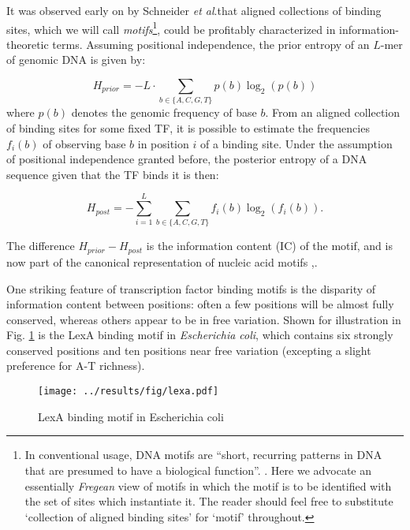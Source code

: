\documentclass{article}
\begin{document}
It was observed early on by Schneider \textit{et al}.\cite{schneider86}that
aligned collections of binding sites, which we will call
\textit{motifs}\footnote{In conventional usage, DNA motifs are ``short, recurring patterns in DNA that are presumed to have a biological function''.
  \cite{dhaeseleer06}.  Here we advocate an essentially
  \textit{Fregean} view of motifs in which the motif is to be
  identified with the set of sites which instantiate it.  The reader
  should feel free to substitute `collection of aligned binding sites'
  for `motif' throughout.}, could be profitably characterized in
information-theoretic terms.  Assuming positional independence, the
prior entropy of an $L$-mer of genomic DNA is given by:

\begin{equation}
  \label{eq:prior_entropy}
  H_{prior} = -L\cdot\sum_{b\in \{A,C,G,T\}}p(b)\log_2(p(b))
\end{equation}
where $p(b)$ denotes the genomic frequency of base $b$.  From an
aligned collection of binding sites for some fixed TF, it is possible
to estimate the frequencies $f_i(b)$ of observing base $b$
in position $i$ of a binding site.  Under the assumption of positional
independence granted before, the posterior entropy of a DNA sequence
given that the TF binds it is then:

\begin{equation}
  \label{eq:post_entropy}
  H_{post} = -\sum_{i=1}^L\sum_{b\in \{A,C,G,T\}}f_i(b)\log_2(f_i(b)).
\end{equation}

The difference $H_{prior}-H_{post}$ is the information content (IC) of
the motif, and is now part of the canonical representation of nucleic
acid motifs \cite{weblogo},\cite{schneider90}.

One striking feature of transcription factor binding motifs is the
disparity of information content between positions: often
a few positions will be almost fully conserved, whereas others appear
to be in free variation.  Shown for illustration in
Fig. \ref{fig:lexa_binding_motif} is the LexA binding motif in
\textit{Escherichia coli}, which contains six strongly conserved
positions and ten positions near free variation (excepting a slight
preference for A-T richness).

\begin{figure}[ht]
  \centering
  \texttt{[image: ../results/fig/lexa.pdf]}
  \caption{LexA binding motif in Escherichia coli}
  \label{fig:lexa_binding_motif}
\end{figure}
\end{document}
